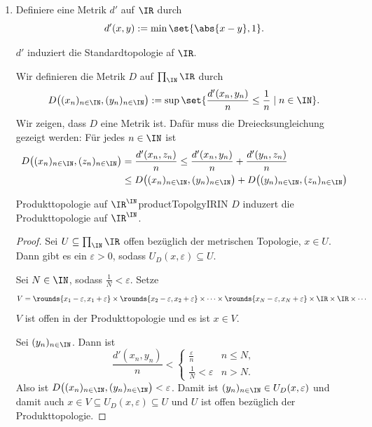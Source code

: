 \documentclass[language=ngerman]{TemplateLecture} %
\begin{document}
\begin{enumerate}
    \item Definiere eine Metrik $d'$ auf $\IR$ durch 
    \begin{equation*}
        d'(x,y) := \min\set{\abs{x-y}, 1}.
    \end{equation*}
    \begin{lemm}
        $d'$ induziert die Standardtopologie af $\IR$.
    \end{lemm}
    Wir definieren die Metrik $D$ auf $\prod_\IN \IR$ durch 
    \begin{equation*}
        D\bigl((x_n)_{n \in \IN}, (y_n)_{n \in \IN}\bigr) := \sup\set{\frac{d'(x_n, y_n)}{n} \leq \frac{1}{n} \mid n \in \IN}.
    \end{equation*}
    Wir zeigen, dass $D$ eine Metrik ist. Dafür muss die Dreiecksungleichung gezeigt werden: Für jedes $n \in \IN$ ist 
    \begin{align*}
        D\bigl((x_n)_{n \in \IN}, (z_n)_{n \in \IN}\bigr) &=\frac{d'(x_n,z_n)}{n} \leq \frac{d'(x_n,y_n)}{n} + \frac{d'(y_n,z_n)}{n} \\
        &\leq D\bigl((x_n)_{n \in \IN}, (y_n)_{n \in \IN}\bigr) + D\bigl((y_n)_{n \in \IN}, (z_n)_{n \in \IN}\bigr)
    \end{align*}
    \begin{lem}{Produkttopologie auf $\IR^\IN$}{productTopolgyIRIN}
        $D$ induzert die Produkttopologie auf $\IR^\IN$.
    \end{lem}
    \begin{proof}
        Sei $U \subseteq \prod_\IN \IR$ offen bezüglich der metrischen Topologie, $x \in U$. Dann gibt es ein $\varepsilon > 0$, sodass $U_D(x,\varepsilon) \subseteq U$.

        Sei $N \in \IN$, sodass $\frac{1}{N} < \varepsilon$. Setze 
        \begin{equation*}
            V = \rounds{x_1 - \varepsilon, x_1 + \varepsilon} \times \rounds{x_2 - \varepsilon, x_2 + \varepsilon} \times \cdots \times \rounds{x_N - \varepsilon, x_N + \varepsilon} \times \IR \times \IR \times \cdots
        \end{equation*}
        $V$ ist offen in der Produkttopologie und es ist $x \in V$. 

        Sei $(y_n)_{n \in \IN}$. Dann ist 
        \begin{equation*}
            \frac{d'(x_n, y_n)}{n} < \begin{cases}
                \frac{\varepsilon}{n} & n \leq N, \\ 
                \frac{1}{N} < \varepsilon & n > N.
            \end{cases}
        \end{equation*}
        Also ist $D\bigl((x_n)_{n \in \IN}, (y_n)_{n \in \IN}\bigr) < \varepsilon$. Damit ist $(y_n)_{n \in \IN} \in U_D(x, \varepsilon)$ und damit auch $x \in V \subseteq U_D(x, \varepsilon) \subseteq U$ und $U$ ist offen bezüglich der Produkttopologie.


\end{proof}
\end{enumerate}
\end{document}
